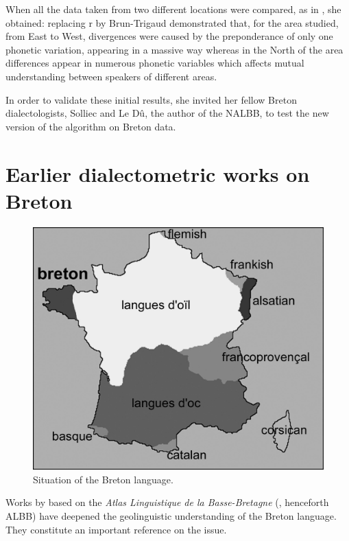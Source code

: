 \documentclass[output=paper]{LSP/langsci}
\begin{document}
When all the data taken from two different locations were compared, as in , she obtained: replacing {r} by 
Brun-Trigaud demonstrated that, for the area studied, from East to West, divergences were caused by the preponderance of only one phonetic variation, appearing in a massive way whereas in the North of the area differences appear in numerous phonetic variables which affects mutual understanding between speakers of different areas.

In order to validate these initial results, she invited her fellow Breton dialectologists, Solliec and Le Dû, the author of the NALBB, to test the new version of the algorithm on Breton data.

\section[Earlier dialectometric works on Breton ]{Earlier dialectometric works on Breton }
  
\begin{figure}
\includegraphics[width=\textwidth]{illustrations/brun_etal_fig1}
\caption{Situation of the Breton language.}
\label{fig:1}
\end{figure}

Works by \citet{falchun_perspectives_1981} based on the \textit{Atlas Linguistique de la Basse-Bretagne} (\citealt{le_roux_atlas_1924}, henceforth ALBB) have deepened the geolinguistic understanding of the Breton language. They constitute an important reference on the issue. 
\end{document}
